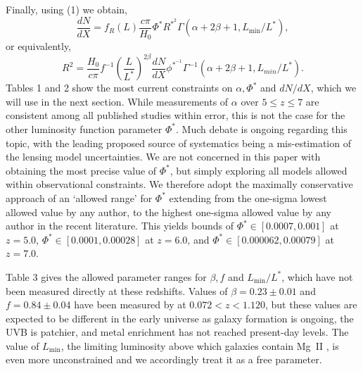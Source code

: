 \documentclass[useAMS,usenatbib]{mn2e}
\newcommand{\magtwo}{Mg~{\small II} }
\begin{document}
Finally, using (1) we obtain,
\begin{equation} 
\frac{dN}{dX} = f_R(L)\frac{c \pi}{H_0} \Phi^* R^{*^2} \Gamma(\alpha+2\beta+1 , L_\text{min}/L^*), 
\end{equation}
or equivalently,
\begin{equation}
 R^{2} =  \frac{H_0}{c\pi} f^{-1} \left(\frac{L}{L^*}\right)^{2\beta} \frac{dN}{dX} \phi^{*^{-1}} \Gamma^{-1}\left(\alpha+2\beta+1, L_{min}/L^*\right).
\end{equation}
Tables 1 and 2 show the most current constraints on $\alpha,\Phi^*$ and $dN/dX$, which we will use in the next section. While measurements of $\alpha$ over $5\leq z\leq 7$ are consistent among all published studies within error, this is not the case for the other luminosity function parameter $\Phi^*$. Much debate is ongoing regarding this topic, with the leading proposed source of systematics being a mis-estimation of the lensing model uncertainties. We are not concerned in this paper with obtaining the most precise value of $\Phi^*$, but simply exploring all models allowed within observational constraints. We therefore adopt the maximally conservative approach of an `allowed range' for $\Phi^*$ extending from the one-sigma lowest allowed value by any author, to the highest one-sigma allowed value by any author in the recent literature. This yields bounds of $\Phi^* \in [0.0007,0.001]$ at $z=5.0$, $\Phi^* \in [0.0001,0.00028]$ at $z=6.0$, and $\Phi^* \in [0.000062,0.00079]$ at $z=7.0$.


Table 3 gives the allowed parameter ranges for $\beta, f$ and $L_\text{min}/L^*$, which have not been measured directly at these redshifts. Values of $\beta=0.23 \pm 0.01$ and $f = 0.84\pm 0.04$ have been measured by  \citet{Nielsen13} at $0.072<z<1.120$, but these values are expected to be different in the early universe as galaxy formation is ongoing, the UVB is patchier, and metal enrichment has not reached present-day levels. The value of $L_\text{min}$, the limiting luminosity above which galaxies contain \magtwo, is even more unconstrained and we accordingly treat it as a free parameter.
\end{document}
